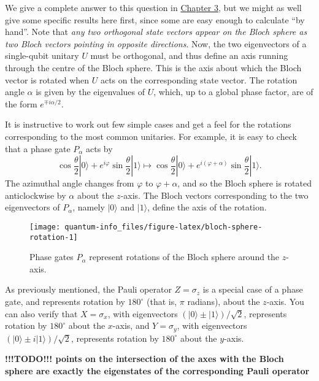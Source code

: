 \documentclass[fleqn]{article}
\begin{document}
We give a complete answer to this question in \protect\hyperlink{chapter3}{Chapter 3}, but we might as well give some specific results here first, since some are easy enough to calculate ``by hand''.
Note that \emph{any two orthogonal state vectors appear on the Bloch sphere as two Bloch vectors pointing in opposite directions}.
Now, the two eigenvectors of a single-qubit unitary \(U\) must be orthogonal, and thus define an axis running through the centre of the Bloch sphere.
This is the axis about which the Bloch vector is rotated when \(U\) acts on the corresponding state vector.
The rotation angle \(\alpha\) is given by the eigenvalues of \(U\), which, up to a global phase factor, are of the form \(e^{\mp i\alpha/2}\).

It is instructive to work out few simple cases and get a feel for the rotations corresponding to the most common unitaries.
For example, it is easy to check that a phase gate \(P_\alpha\) acts by
\[
  \cos\frac{\theta}{2}|0\rangle + e^{i\varphi}\sin\frac{\theta}{2}|1\rangle
  \longmapsto
  \cos\frac{\theta}{2}|0\rangle + e^{i(\varphi+\alpha)}\sin\frac{\theta}{2}|1\rangle.
\]
The azimuthal angle changes from \(\varphi\) to \(\varphi+\alpha\), and so the Bloch sphere is rotated anticlockwise by \(\alpha\) about the \(z\)-axis.
The Bloch vectors corresponding to the two eigenvectors of \(P_\alpha\), namely \(|0\rangle\) and \(|1\rangle\), define the axis of the rotation.



\begin{figure}[H]

{\centering \texttt{[image: quantum-info\_files/figure-latex/bloch-sphere-rotation-1]} 

}

\caption{Phase gates \(P_\alpha\) represent rotations of the Bloch sphere around the \(z\)-axis.}\label{fig:bloch-sphere-rotation}
\end{figure}

As previously mentioned, the Pauli operator \(Z=\sigma_z\) is a special case of a phase gate, and represents rotation by \({180}^{\circ}\) (that is, \(\pi\) radians), about the \(z\)-axis.
You can also verify that \(X=\sigma_x\), with eigenvectors \({(|0\rangle\pm|1\rangle)/\sqrt{2}}\), represents rotation by \({180}^{\circ}\) about the \(x\)-axis, and \(Y=\sigma_y\), with eigenvectors \({(|0\rangle\pm i|1\rangle)/\sqrt{2}}\), represents rotation by \({180}^{\circ}\) about the \(y\)-axis.

\textbf{!!!TODO!!! points on the intersection of the axes with the Bloch sphere are exactly the eigenstates of the corresponding Pauli operator}
\end{document}
